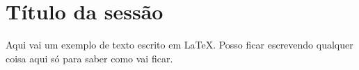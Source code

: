 \documentclass{article}
\begin{document}
\section*{Título da sessão}
Aqui vai um exemplo de texto escrito em \LaTeX{}. Posso ficar escrevendo qualquer coisa aqui só para saber como vai ficar.
\end{document}
